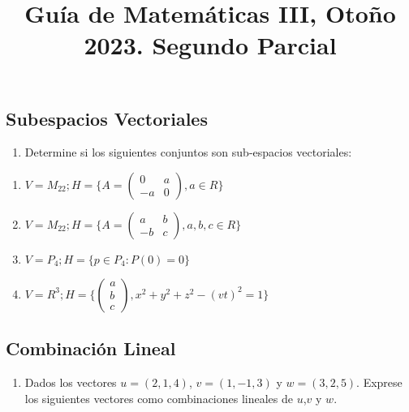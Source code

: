 \documentclass[
  11,
]{article}
\title{Guía de Matemáticas III, Otoño 2023. Segundo Parcial}
\author{}
\date{\vspace{-2.5em}}
\providecommand{\tightlist}{%
  \setlength{\itemsep}{0pt}\setlength{\parskip}{0pt}}
\begin{document}
\maketitle

\hypertarget{subespacios-vectoriales}{%
\subsection{Subespacios Vectoriales}\label{subespacios-vectoriales}}

\begin{enumerate}
\def\labelenumi{\arabic{enumi}.}
\tightlist
\item
  Determine si los siguientes conjuntos son sub-espacios vectoriales:
\end{enumerate}

\begin{enumerate}
\def\labelenumi{\alph{enumi})}
\item
  \(V = M_{22}; H = \{ A = \begin{pmatrix} 0 & a \\ -a & 0\end{pmatrix}, a \in R \}\)
\item
  \(V = M_{22}; H = \{A = \begin{pmatrix}a& b \\ -b &c \end{pmatrix},a,b,c\in R\}\)
\item
  \(V = P_4; H = \{ p \in P_4: P(0) = 0\}\)
\item
  \(V = R^3; H = \{ \begin{pmatrix}a\\b\\c\end{pmatrix}, x^2 + y^2 + z^2 - (vt)^2 = 1 \}\)
\end{enumerate}

\hypertarget{combinaciuxf3n-lineal}{%
\subsection{Combinación Lineal}\label{combinaciuxf3n-lineal}}

\begin{enumerate}
\def\labelenumi{\arabic{enumi}.}
\tightlist
\item
  Dados los vectores \(u = (2,1,4)\), \(v = (1,-1,3)\) y
  \(w = (3,2,5)\). Exprese los siguientes vectores como combinaciones
  lineales de \(u\),\(v\) y \(w\).
\end{enumerate}
\end{document}
